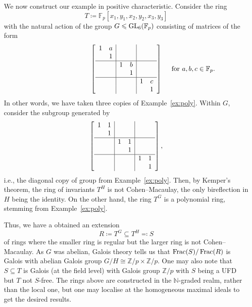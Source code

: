 \documentclass[12pt]{article}
\begin{document}
	We now construct our example in positive characteristic. 
	Consider the ring 
	\begin{equation*} 
		T \coloneqq \mathbb{F}_{p}[x_1, y_1, x_2, y_2, x_3, y_3]
	\end{equation*}
	with the natural action of the group $G \leqslant \operatorname{GL}_{6}(\mathbb{F}_{p})$ consisting of matrices of the form
	\begin{equation*} 
		\phantom{\quad\text{ for } a,b,c \in \mathbb{F}_{p}.}
		\left[
		\begin{array}{cc|cc|cc}
		1 & a & & & &\\
		& 1 & & & &\\
		\hline
		& & 1 & b & &\\
		& & & 1 & &\\
		\hline
		& & & & 1 & c\\
		& & & & & 1
		\end{array}
		\right]
		\quad\text{ for } a,b,c \in \mathbb{F}_{p}.
	\end{equation*}
	In other words, we have taken three copies of Example~\ref{ex:poly}. 
	Within $G$, consider the subgroup generated by
	\begin{equation*} 
		\left[
		\begin{array}{cc|cc|cc}
		1 & 1 & & & &\\
		& 1 & & & &\\
		\hline
		& & 1 & 1 & &\\
		& & & 1 & &\\
		\hline
		& & & & 1 & 1\\
		& & & & & 1
		\end{array}
		\right],
	\end{equation*}	
	i.e., the diagonal copy of group from Example~\ref{ex:poly}. 
	Then, by Kemper's theorem, the ring of invariants $T^H$ is not Cohen--Macaulay, the only bireflection in $H$ being the identity. 
	On the other hand, the ring $T^G$ is a polynomial ring, stemming from Example~\ref{ex:poly}. 

	Thus, we have a obtained an extension
	\begin{equation*} 
		R \coloneqq T^G \subseteq T^H \eqqcolon S
	\end{equation*}
	of rings where the smaller ring is regular but the larger ring is not Cohen--Macaulay. 
	As $G$ was abelian, Galois theory tells us that $\operatorname{Frac}(S)/\operatorname{Frac}(R)$ is Galois with abelian Galois group $G/H \cong \mathbb{Z}/p \times \mathbb{Z}/p$. 
	One may also note that $S \subseteq T$ is Galois (at the field level) with Galois group $\mathbb{Z}/p$ with $S$ being a UFD but $T$ not $S$-free. 
	The rings above are constructed in the $\mathbb{N}$-graded realm, rather than the local one, but one may localise at the homogeneous maximal ideals to get the desired results. 

\printbibliography
\end{document}
